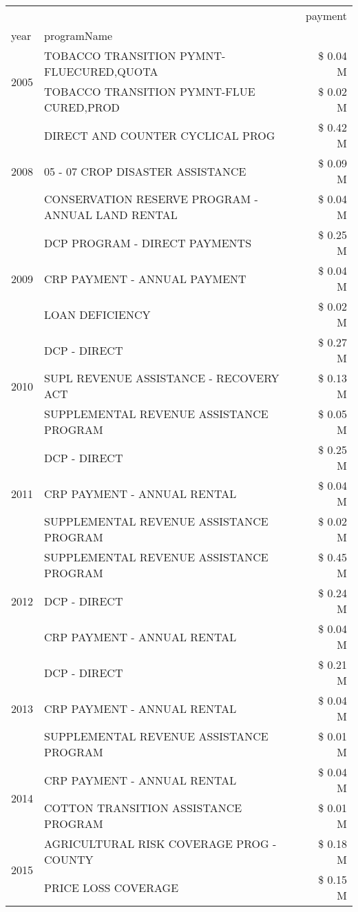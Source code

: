 \begin{tabular}{llr}
\toprule
 &  & payment \\
year & programName &  \\
\midrule
\multirow[t]{2}{*}{2005} & TOBACCO TRANSITION PYMNT-FLUECURED,QUOTA & \$ 0.04 M \\
 & TOBACCO TRANSITION PYMNT-FLUE CURED,PROD & \$ 0.02 M \\
\cline{1-3}
\multirow[t]{3}{*}{2008} & DIRECT AND COUNTER CYCLICAL PROG & \$ 0.42 M \\
 & 05 - 07 CROP DISASTER ASSISTANCE & \$ 0.09 M \\
 & CONSERVATION RESERVE PROGRAM - ANNUAL LAND RENTAL & \$ 0.04 M \\
\cline{1-3}
\multirow[t]{3}{*}{2009} & DCP PROGRAM - DIRECT PAYMENTS & \$ 0.25 M \\
 & CRP PAYMENT - ANNUAL PAYMENT & \$ 0.04 M \\
 & LOAN DEFICIENCY & \$ 0.02 M \\
\cline{1-3}
\multirow[t]{3}{*}{2010} & DCP - DIRECT & \$ 0.27 M \\
 & SUPL REVENUE ASSISTANCE - RECOVERY ACT & \$ 0.13 M \\
 & SUPPLEMENTAL REVENUE ASSISTANCE PROGRAM & \$ 0.05 M \\
\cline{1-3}
\multirow[t]{3}{*}{2011} & DCP - DIRECT & \$ 0.25 M \\
 & CRP PAYMENT - ANNUAL RENTAL & \$ 0.04 M \\
 & SUPPLEMENTAL REVENUE ASSISTANCE PROGRAM & \$ 0.02 M \\
\cline{1-3}
\multirow[t]{3}{*}{2012} & SUPPLEMENTAL REVENUE ASSISTANCE PROGRAM & \$ 0.45 M \\
 & DCP - DIRECT & \$ 0.24 M \\
 & CRP PAYMENT - ANNUAL RENTAL & \$ 0.04 M \\
\cline{1-3}
\multirow[t]{3}{*}{2013} & DCP - DIRECT & \$ 0.21 M \\
 & CRP PAYMENT - ANNUAL RENTAL & \$ 0.04 M \\
 & SUPPLEMENTAL REVENUE ASSISTANCE PROGRAM & \$ 0.01 M \\
\cline{1-3}
\multirow[t]{2}{*}{2014} & CRP PAYMENT - ANNUAL RENTAL & \$ 0.04 M \\
 & COTTON TRANSITION ASSISTANCE PROGRAM & \$ 0.01 M \\
\cline{1-3}
\multirow[t]{3}{*}{2015} & AGRICULTURAL RISK COVERAGE PROG - COUNTY & \$ 0.18 M \\
 & PRICE LOSS COVERAGE & \$ 0.15 M \\

\end{tabular}
